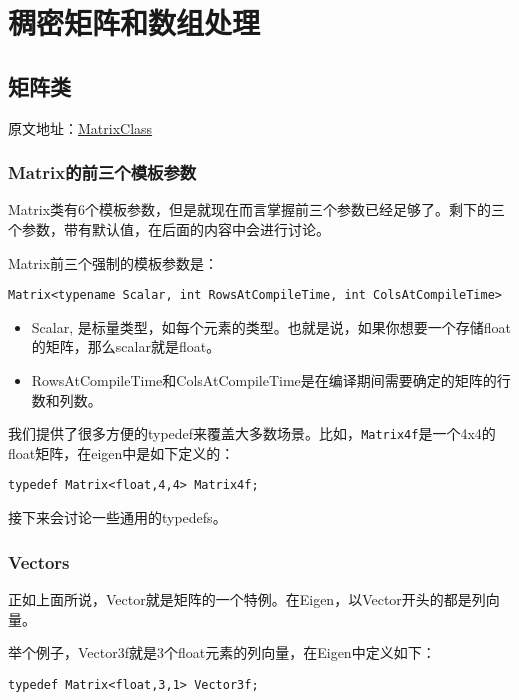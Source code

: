 \chapter{稠密矩阵和数组处理}

\section{矩阵类}
原文地址：\href{http://eigen.tuxfamily.org/dox/group__TutorialMatrixClass.html}{MatrixClass}

\subsection{Matrix的前三个模板参数}
Matrix类有6个模板参数，但是就现在而言掌握前三个参数已经足够了。剩下的三个参数，带有默认值，在后面的内容中会进行讨论。

Matrix前三个强制的模板参数是：

\verb|Matrix<typename Scalar, int RowsAtCompileTime, int ColsAtCompileTime>|

\begin{itemize}
\item Scalar, 是标量类型，如每个元素的类型。也就是说，如果你想要一个存储float的矩阵，那么scalar就是float。
\item RowsAtCompileTime和ColsAtCompileTime是在编译期间需要确定的矩阵的行数和列数。
\end{itemize}

我们提供了很多方便的typedef来覆盖大多数场景。比如，\verb|Matrix4f|是一个4x4的float矩阵，在eigen中是如下定义的：

\verb|typedef Matrix<float,4,4> Matrix4f;|

接下来会讨论一些通用的typedefs。

\subsection{Vectors}

正如上面所说，Vector就是矩阵的一个特例。在Eigen，以Vector开头的都是列向量。

举个例子，Vector3f就是3个float元素的列向量，在Eigen中定义如下：

\verb|typedef Matrix<float,3,1> Vector3f;|

